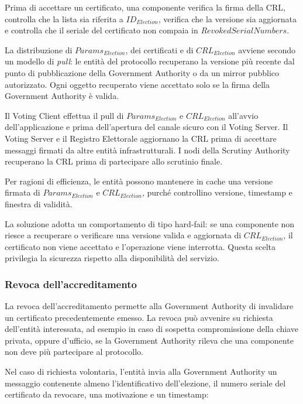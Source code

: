 \documentclass[a4paper,12pt]{article}
\begin{document}
Prima di accettare un certificato, una componente verifica la firma della CRL, controlla che la lista sia riferita a \(ID_{Election}\), verifica che la versione sia aggiornata e controlla che il seriale del certificato non compaia in \(RevokedSerialNumbers\).

La distribuzione di \(Params_{Election}\), dei certificati e di \(CRL_{Election}\) avviene secondo un modello di \emph{pull}: le entit\`a del protocollo recuperano la versione pi\`u recente dal punto di pubblicazione della Government Authority o da un mirror pubblico autorizzato. 
Ogni oggetto recuperato viene accettato solo se la firma della Government Authority \`e valida.

Il Voting Client effettua il pull di \(Params_{Election}\) e \(CRL_{Election}\) all'avvio dell'applicazione e prima dell'apertura del canale sicuro con il Voting Server. 
Il Voting Server e il Registro Elettorale aggiornano la CRL prima di accettare messaggi firmati da altre entit\`a infrastrutturali. 
I nodi della Scrutiny Authority recuperano la CRL prima di partecipare allo scrutinio finale.

Per ragioni di efficienza, le entit\`a possono mantenere in cache una versione firmata di \(Params_{Election}\) e \(CRL_{Election}\), purch\'e controllino versione, timestamp e finestra di validit\`a. 

La soluzione adotta un comportamento di tipo hard-fail: se una componente non riesce a recuperare o verificare una versione valida e aggiornata di \(CRL_{Election}\), il certificato non viene accettato e l'operazione viene interrotta. 
Questa scelta privilegia la sicurezza rispetto alla disponibilit\`a del servizio.

\subsubsection{Revoca dell'accreditamento}

La revoca dell'accreditamento permette alla Government Authority di invalidare un certificato precedentemente emesso. 
La revoca pu\`o avvenire su richiesta dell'entit\`a interessata, ad esempio in caso di sospetta compromissione della chiave privata, oppure d'ufficio, se la Government Authority rileva che una componente non deve pi\`u partecipare al protocollo.

Nel caso di richiesta volontaria, l'entit\`a invia alla Government Authority un messaggio contenente almeno l'identificativo dell'elezione, il numero seriale del certificato da revocare, una motivazione e un timestamp:
\end{document}
